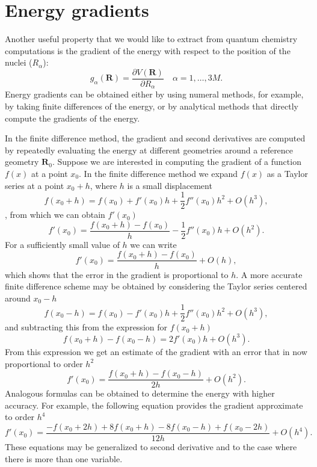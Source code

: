 \documentclass[../Main/chem532-notes.tex]{subfiles}
\begin{document}
\section{Energy gradients}
Another useful property that we would like to extract from quantum chemistry computations is the gradient of the energy with respect to the position of the nuclei ($R_\alpha$):
\begin{equation}
g_\alpha(\mathbf{R}) = \frac{\partial V(\mathbf{R})}{\partial R_\alpha} \quad \alpha = 1,\ldots,3M.
\end{equation}
Energy gradients can be obtained either by using numeral methods, for example, by taking finite differences of the energy, or by analytical methods that directly compute the gradients of the energy.

In the finite difference method, the gradient and second derivatives are computed by repeatedly evaluating the energy at different geometries around a reference geometry $\mathbf{R}_0$.
Suppose we are interested in computing the gradient of a function $f(x)$ at a point $x_0$. In the finite difference method we expand $f(x)$ as a Taylor series at a point $x_0 + h$, where $h$ is a small displacement
\begin{equation}
f(x_0 + h) = f(x_0) + f'(x_0) h + \frac{1}{2} f''(x_0) h^2 + O(h^3),
\end{equation},
from which we can obtain $f'(x_0)$
\begin{equation}
f'(x_0) = \frac{f(x_0 + h) -f(x_0)}{h} - \frac{1}{2} f''(x_0) h + O(h^2).
\end{equation}
For a sufficiently small value of $h$ we can write
\begin{equation}
f'(x_0) = \frac{f(x_0 + h) -f(x_0)}{h} + O(h),
\end{equation}
which shows that the error in the gradient is proportional to $h$.
A more accurate finite difference scheme may be obtained by considering the Taylor series centered around $x_0 - h$
\begin{equation}
f(x_0 - h) = f(x_0) - f'(x_0) h + \frac{1}{2} f''(x_0) h^2 + O(h^3),
\end{equation}
and subtracting this from the expression for $f(x_0 + h)$
\begin{equation}
f(x_0 + h) - f(x_0 - h) = 2 f'(x_0) h + O(h^3).
\end{equation}
From this expression we get an estimate of the gradient with an error that in now proportional to order $h^2$
\begin{equation}
f'(x_0) = \frac{f(x_0 + h) - f(x_0 - h)}{2h} + O(h^2).
\end{equation}
Analogous formulas can be obtained to determine the energy with higher accuracy. For example, the following equation provides the gradient approximate to order $h^4$
\begin{equation}
f'(x_0) = \frac{-f(x_0 + 2h) + 8 f(x_0 + h)- 8f(x_0 - h) + f(x_0 - 2h)}{12h} + O(h^4).
\end{equation}
These equations may be generalized to second derivative and to the case where there is more than one variable.
\end{document}
